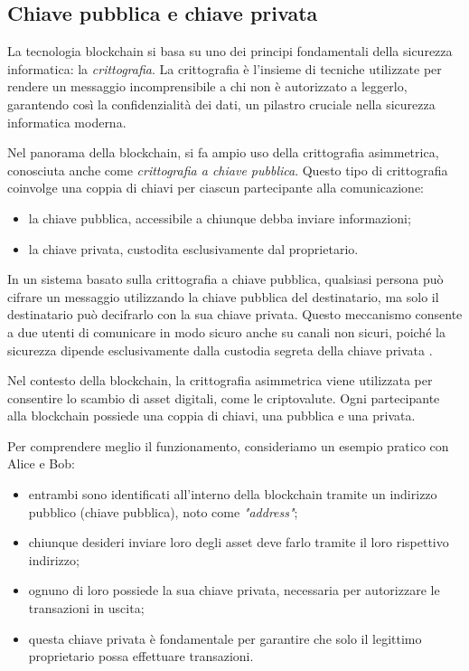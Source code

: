 \subsection{Chiave pubblica e chiave privata}\label{subsec:chiavi}
La tecnologia blockchain si basa su uno dei principi fondamentali della sicurezza informatica: la \textit{crittografia}. 
La crittografia è l'insieme di tecniche utilizzate per rendere un messaggio incomprensibile a chi non è autorizzato a leggerlo, 
garantendo così la confidenzialità dei dati, un pilastro cruciale nella sicurezza informatica moderna.

Nel panorama della blockchain, si fa ampio uso della crittografia asimmetrica, conosciuta anche come \textit{crittografia a chiave pubblica}. 
Questo tipo di crittografia coinvolge una coppia di chiavi per ciascun partecipante alla comunicazione:
\begin{itemize}
    \item la chiave pubblica, accessibile a chiunque debba inviare informazioni;
    \item la chiave privata, custodita esclusivamente dal proprietario.
\end{itemize}

In un sistema basato sulla crittografia a chiave pubblica, qualsiasi persona può cifrare un messaggio utilizzando la chiave 
pubblica del destinatario, ma solo il destinatario può decifrarlo con la sua chiave privata. Questo meccanismo consente a due 
utenti di comunicare in modo sicuro anche su canali non sicuri, poiché la sicurezza dipende esclusivamente dalla custodia 
segreta della chiave privata \cite{crittografiaAsimmetrica}.

Nel contesto della blockchain, la crittografia asimmetrica viene utilizzata per consentire lo scambio di asset digitali, 
come le criptovalute. Ogni partecipante alla blockchain possiede una coppia di chiavi, una pubblica e una privata.

Per comprendere meglio il funzionamento, consideriamo un esempio pratico con Alice e Bob:
\begin{itemize}
    \item entrambi sono identificati all'interno della blockchain tramite un indirizzo pubblico (chiave pubblica), noto 
        come \textit{"address"};
    \item chiunque desideri inviare loro degli asset deve farlo tramite il loro rispettivo indirizzo;
    \item ognuno di loro possiede la sua chiave privata, necessaria per autorizzare le transazioni in uscita;
    \item questa chiave privata è fondamentale per garantire che solo il legittimo proprietario possa effettuare transazioni.
\end{itemize}

